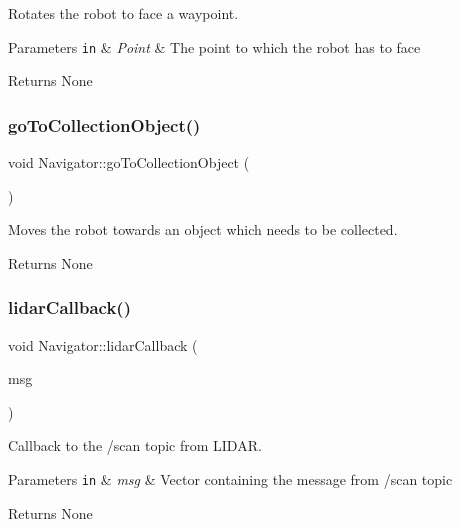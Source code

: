 Rotates the robot to face a waypoint. 


\begin{DoxyParams}[1]{Parameters}
\mbox{\tt in}  & {\em Point} & The point to which the robot has to face\\
\hline
\end{DoxyParams}
\begin{DoxyReturn}{Returns}
None 
\end{DoxyReturn}
\mbox{\label{class_navigator_a8c3589733dc9aaf4109bddbee827f8eb}} 
\subsubsection{\texorpdfstring{go\+To\+Collection\+Object()}{goToCollectionObject()}}
{\footnotesize\ttfamily void Navigator\+::go\+To\+Collection\+Object (\begin{DoxyParamCaption}{ }\end{DoxyParamCaption})}



Moves the robot towards an object which needs to be collected. 

\begin{DoxyReturn}{Returns}
None 
\end{DoxyReturn}
\mbox{\label{class_navigator_aacf40aee867f32fd7ebd217323bbae45}} 
\subsubsection{\texorpdfstring{lidar\+Callback()}{lidarCallback()}}
{\footnotesize\ttfamily void Navigator\+::lidar\+Callback (\begin{DoxyParamCaption}\item[{const sensor\+\_\+msgs\+::\+Laser\+Scan\+::\+Const\+Ptr \&}]{msg }\end{DoxyParamCaption})}



Callback to the /scan topic from L\+I\+D\+AR. 


\begin{DoxyParams}[1]{Parameters}
\mbox{\tt in}  & {\em msg} & Vector containing the message from /scan topic \\
\hline
\end{DoxyParams}
\begin{DoxyReturn}{Returns}
None 
\end{DoxyReturn}
\mbox{\label{class_navigator_a31877b789e0075b41e61ee5cf02e836d}} 
